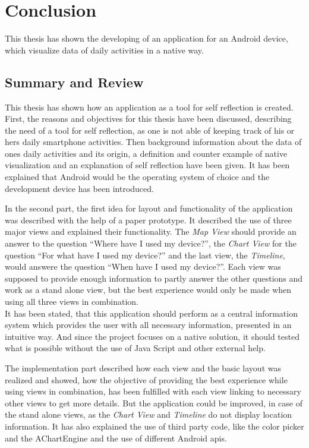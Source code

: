 \chapter{Conclusion}
\label{cha:conclusion}

This thesis has shown the developing of an application for an Android device, which visualize data of daily activities in a native way.

\section{Summary and Review}
This thesis has shown how an application as a tool for self reflection is created. First, the reasons and objectives for this thesis have been discussed, describing the need of a tool for self reflection, as one is not able of keeping track of his or hers daily smartphone activities. Then background information about the data of ones daily activities and its origin, a definition and counter example of native visualization and an explanation of self reflection have been given. It has been explained that Android would be the operating system of choice and the development device has been introduced.

In  the second part, the first idea for layout and functionality of the application was described with the help of a paper prototype. It described the use of three major views and explained their functionality. The \emph{Map View} should provide an answer to the question ``Where have I used my device?'', the \emph{Chart View} for the question ``For what have I used my device?'' and the last view, the \emph{Timeline}, would answere the question ``When have I used my device?''. Each view was supposed to provide enough information to partly answer the other questions and work as a stand alone view, but the best experience would only be made when using all three views in combination.\\
It has been stated, that this application should perform as a central information system which provides the user with all necessary information, presented in an intuitive way. And since the project focuses on a native solution, it should tested what is possible without the use of Java Script and other external help.

The  implementation part described how each view and the basic layout was realized and showed, how the objective of providing the best experience while using views in combination, has been fulfilled with each view linking to necessary other views to get more details. But the application could be improved, in case of the stand alone views, as the \emph{Chart View} and \emph{Timeline} do not display location information. It has also explained the use of third party code, like the color picker and the AChartEngine and the use of different Android apis.

